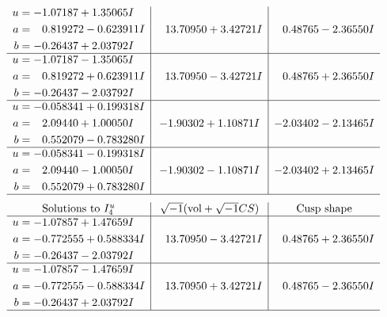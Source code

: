 \documentclass[1p]{elsarticle_modified}
\theoremstyle{definition}
\newcommand{\I}{\sqrt{-1}}
\begin{document}
$$\begin{array}{c|c|c}
\begin{aligned}
u &= -1.07187 + 1.35065 I \\
a &= \phantom{-}0.819272 - 0.623911 I \\
b &= -0.26437 + 2.03792 I\end{aligned}
 & \phantom{-}13.70950 + 3.42721 I & \phantom{-}0.48765 - 2.36550 I \\ \hline\begin{aligned}
u &= -1.07187 - 1.35065 I \\
a &= \phantom{-}0.819272 + 0.623911 I \\
b &= -0.26437 - 2.03792 I\end{aligned}
 & \phantom{-}13.70950 - 3.42721 I & \phantom{-}0.48765 + 2.36550 I \\ \hline\begin{aligned}
u &= -0.058341 + 0.199318 I \\
a &= \phantom{-}2.09440 + 1.00050 I \\
b &= \phantom{-}0.552079 - 0.783280 I\end{aligned}
 & -1.90302 + 1.10871 I & -2.03402 - 2.13465 I \\ \hline\begin{aligned}
u &= -0.058341 - 0.199318 I \\
a &= \phantom{-}2.09440 - 1.00050 I \\
b &= \phantom{-}0.552079 + 0.783280 I\end{aligned}
 & -1.90302 - 1.10871 I & -2.03402 + 2.13465 I\\
 \hline 
 \end{array}$$\newpage$$\begin{array}{c|c|c}  
\text{Solutions to }I^u_{4}& \I (\text{vol} + \sqrt{-1}CS) & \text{Cusp shape}\\
 \hline 
\begin{aligned}
u &= -1.07857 + 1.47659 I \\
a &= -0.772555 + 0.588334 I \\
b &= -0.26437 - 2.03792 I\end{aligned}
 & \phantom{-}13.70950 - 3.42721 I & \phantom{-}0.48765 + 2.36550 I \\ \hline\begin{aligned}
u &= -1.07857 - 1.47659 I \\
a &= -0.772555 - 0.588334 I \\
b &= -0.26437 + 2.03792 I\end{aligned}
 & \phantom{-}13.70950 + 3.42721 I & \phantom{-}0.48765 - 2.36550 I\\
 \hline 
 \end{array}$$\newpage
\end{document}
